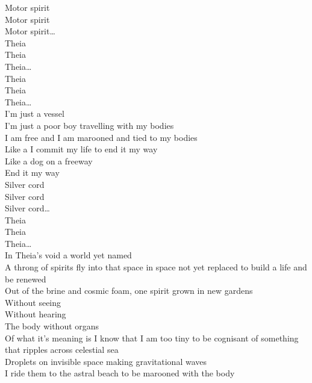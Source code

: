 
Motor spirit\\
Motor spirit\\
Motor spirit…\\

Theia\\
Theia\\
Theia…\\

Theia\\
Theia\\
Theia…\\

I'm just a vessel\\
I'm just a poor boy travelling with my bodies\\
I am free and I am marooned and tied to my bodies\\

Like a  I commit my life to end it my way\\
Like a dog on a freeway\\
End it my way\\

Silver cord\\
Silver cord\\
Silver cord…\\

Theia\\
Theia\\
Theia…\\

In Theia's void a world yet named\\
A throng of spirits fly into that space in space not yet replaced to build a life and be renewed\\
Out of the brine and cosmic foam, one spirit grown in new gardens\\
Without seeing\\
Without hearing\\
The body without organs\\

Of what it's meaning is I know that I am too tiny to be cognisant of something that ripples across celestial sea\\
Droplets on invisible space making gravitational waves\\
I ride them to the astral beach to be marooned with the body\\


